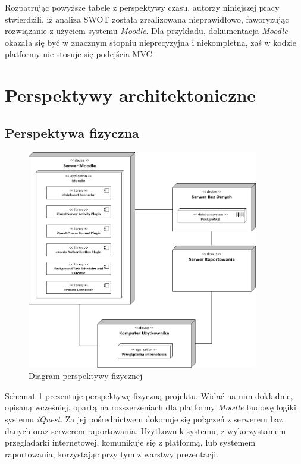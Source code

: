 Rozpatrując powyższe tabele z perspektywy czasu, autorzy niniejszej pracy stwierdzili, iż analiza SWOT została zrealizowana nieprawidłowo, faworyzując rozwiązanie z użyciem systemu \textit{Moodle}. Dla przykładu, dokumentacja \textit{Moodle} okazała się być w znacznym stopniu nieprecyzyjna i niekompletna, zaś w kodzie platformy nie stosuje się podejścia MVC.

\section{Perspektywy architektoniczne}
\label{Chapter54}

\subsection{Perspektywa fizyczna}
\label{Chapter541}

\begin{figure}[H]
\centering\includegraphics[width=0.9\textwidth]{figures/PhysicalView}
\caption{Diagram perspektywy fizycznej}\label{rys:PerspektywaFizyczna}
\end{figure}

Schemat \ref{rys:PerspektywaFizyczna} prezentuje perspektywę fizyczną projektu. Widać na nim dokładnie, opisaną wcześniej, opartą na rozszerzeniach dla platformy \textit{Moodle} budowę logiki systemu \textit{iQuest}. Za jej pośrednictwem dokonuje się połączeń z serwerem baz danych oraz serwerem raportowania. Użytkownik systemu, z wykorzystaniem przeglądarki internetowej, komunikuje się z platformą, lub systemem raportowania, korzystając przy tym z warstwy prezentacji.

